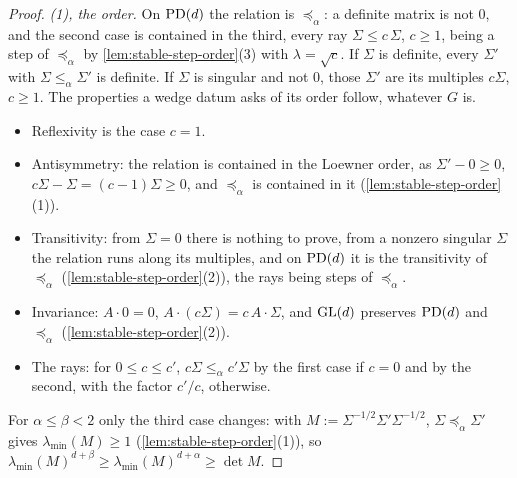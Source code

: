 \begin{proof}
\leanok
\emph{(1), the order.} On $\mathrm{PD}(d)$ the relation is $\preceq_\alpha$: a definite matrix is not $0$, and
the second case is contained in the third, every ray $\Sigma \le c\,\Sigma$, $c \ge 1$, being a step of
$\preceq_\alpha$ by \ref{lem:stable-step-order}(3) with $\lambda = \sqrt c$. If $\Sigma$ is definite, every
$\Sigma'$ with $\Sigma \le_\alpha \Sigma'$ is definite. If $\Sigma$ is singular and not $0$, those $\Sigma'$
are its multiples $c\Sigma$, $c \ge 1$. The properties a wedge datum asks of its order follow, whatever
$G$ is.
\begin{itemize}
\item Reflexivity is the case $c = 1$.
\item Antisymmetry: the relation is contained in the Loewner order, as $\Sigma' - 0 \ge 0$,
$c\Sigma - \Sigma = (c-1)\Sigma \ge 0$, and $\preceq_\alpha$ is contained in it
(\ref{lem:stable-step-order}(1)).
\item Transitivity: from $\Sigma = 0$ there is nothing to prove, from a nonzero singular $\Sigma$ the
relation runs along its multiples, and on $\mathrm{PD}(d)$ it is the transitivity of $\preceq_\alpha$
(\ref{lem:stable-step-order}(2)), the rays being steps of $\preceq_\alpha$.
\item Invariance: $A\cdot 0 = 0$, $A\cdot(c\Sigma) = c\,A\cdot\Sigma$, and $\mathrm{GL}(d)$ preserves $\mathrm{PD}(d)$ and
$\preceq_\alpha$ (\ref{lem:stable-step-order}(2)).
\item The rays: for $0 \le c \le c'$, $c\Sigma \le_\alpha c'\Sigma$ by the first case if $c = 0$ and by the
second, with the factor $c'/c$, otherwise.
\end{itemize}
For $\alpha \le \beta < 2$ only the third case changes: with $M := \Sigma^{-1/2}\Sigma'\Sigma^{-1/2}$,
$\Sigma \preceq_\alpha \Sigma'$ gives $\lambda_{\min}(M) \ge 1$ (\ref{lem:stable-step-order}(1)), so
$\lambda_{\min}(M)^{d+\beta} \ge \lambda_{\min}(M)^{d+\alpha} \ge \det M$.


\end{proof}
